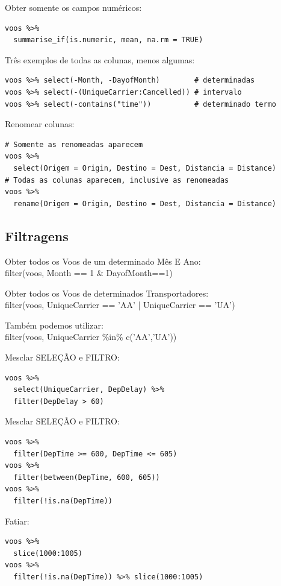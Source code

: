\documentclass[a4paper,11pt]{article}
\begin{document}
Obter somente os campos numéricos:
\begin{lstlisting}
voos %>% 
  summarise_if(is.numeric, mean, na.rm = TRUE)
\end{lstlisting}

Três exemplos de todas as colunas, menos algumas:
\begin{lstlisting}
voos %>% select(-Month, -DayofMonth)        # determinadas
voos %>% select(-(UniqueCarrier:Cancelled)) # intervalo
voos %>% select(-contains("time"))          # determinado termo 
\end{lstlisting}

Renomear colunas:
\begin{lstlisting}
# Somente as renomeadas aparecem
voos %>% 
  select(Origem = Origin, Destino = Dest, Distancia = Distance)
# Todas as colunas aparecem, inclusive as renomeadas
voos %>% 
  rename(Origem = Origin, Destino = Dest, Distancia = Distance)
\end{lstlisting}

\subsection{Filtragens}
Obter todos os Voos de um determinado Mês E Ano: \\
{\ttfamily filter(voos, Month == 1 \& DayofMonth==1)}

Obter todos os Voos de determinados Transportadores: \\
{\ttfamily filter(voos, UniqueCarrier == 'AA' | UniqueCarrier == 'UA')}

Também podemos utilizar: \\
{\ttfamily filter(voos, UniqueCarrier \%in\% c('AA','UA'))}

Mesclar SELEÇÃO e FILTRO:
\begin{lstlisting}
voos %>%
  select(UniqueCarrier, DepDelay) %>%
  filter(DepDelay > 60)
\end{lstlisting}

Mesclar SELEÇÃO e FILTRO:
\begin{lstlisting}
voos %>% 
  filter(DepTime >= 600, DepTime <= 605)
voos %>% 
  filter(between(DepTime, 600, 605))
voos %>% 
  filter(!is.na(DepTime))
\end{lstlisting}

Fatiar:
\begin{lstlisting}
voos %>% 
  slice(1000:1005)
voos %>% 
  filter(!is.na(DepTime)) %>% slice(1000:1005)
\end{lstlisting}
\end{document}
